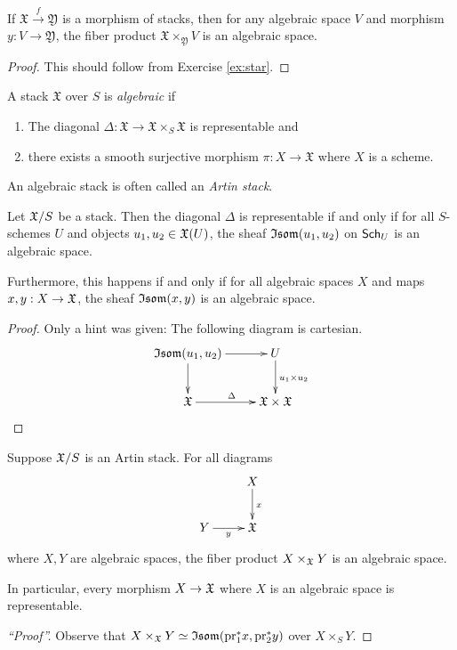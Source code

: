 \documentclass[11pt, english]{article}
\begin{document}
\begin{lemma}
If $\mathfrak X \xrightarrow{f} \mathfrak Y$ is a morphism of stacks, then for any algebraic space $V$ and morphism $y:V \to \mathfrak Y$, the fiber product $\mathfrak X \times_{\mathfrak Y} V$ is an algebraic space.
\end{lemma}
\begin{proof}
This should follow from Exercise \ref{ex:star}.
\end{proof}

\begin{defi}
\label{def:algstack}
A stack $\mathfrak X$ over $S$ is \emph{algebraic} if 
\begin{enumerate}
\item The diagonal $\Delta:\mathfrak X \to \mathfrak X \times_S \mathfrak X$ is representable and
\item there exists a smooth surjective morphism $\pi:X \to \mathfrak X$ where $X$ is a scheme.
\end{enumerate}
\end{defi}

An algebraic stack is often called an \emph{Artin stack}.

\begin{lemma}
\label{lemma11.1}
Let $\mathfrak X/S$ be a stack. Then the diagonal $\Delta$ is representable if and only if for all $S$-schemes $U$ and objects $u_1,u_2 \in \mathfrak X(U)$, the sheaf $\mathfrak{Isom}(u_1,u_2)$ on $\mathsf{Sch}_{U}$ is an algebraic space.

Furthermore, this happens if and only if for all algebraic spaces $X$ and maps $x,y: X \to \mathfrak X$, the sheaf $\mathfrak{Isom}(x,y)$ is an algebraic space.
\end{lemma}
\begin{proof}
Only a hint was given: The following diagram is cartesian.
\[
\xymatrix{
\Isom(u_1, u_2) \ar[r] \ar[d] & U \ar[d]^{u_1 \times u_2} \\
\XX \ar[r]^\Delta & \XX \X \XX
}
\]
\end{proof}

\begin{lemma}
Suppose $\mathfrak X / S$ is an Artin stack. For all diagrams
\[
\xymatrix{
 & X \ar[d]^x \\
Y \ar[r]_y & \XX
}
\]
where $X,Y$ are algebraic spaces, the fiber product $X \times_\mathfrak X Y$ is an algebraic space.

In particular, every morphism $X \to \mathfrak X$ where $X$ is an algebraic space is representable.
\end{lemma}
\begin{proof}[``Proof'']
Observe that $X \times_{\mathfrak X} Y \simeq \mathfrak{Isom}(\mathrm{pr}_1^\ast x, \mathrm{pr}_2^\ast y)$ over $X \times_S Y$.
\end{proof}
\end{document}
